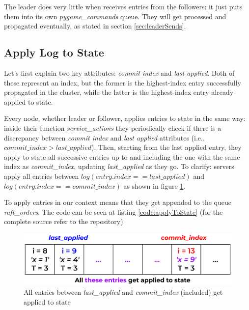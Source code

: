The leader does very little when receives entries from the followers: it just puts them into its own \textit{pygame\_commands} queue. They will get processed and propagated eventually, as stated in section \ref{sec:leaderSends}.

\subsection{Apply Log to State} \label{sec:applyToState}

Let's first explain two key attributes: \textit{commit index} and \textit{last applied}. Both of these represent an index, but the former is the highest-index entry successfully propagated in the cluster, while the latter is the highest-index entry already applied to state. 

Every node, whether leader or follower, applies entries to state in the same way: inside their function \textit{service\_actions} they periodically check if there is a discrepancy between \textit{commit index} and \textit{last applied} attributes (i.e., $commit\_index > last\_applied$). Then, starting from the last applied entry, they apply to state all successive entries up to and including the one with the same index as \textit{commit\_index}, updating \textit{last\_applied} as they go. To clarify: servers apply all entries between $log(entry.index == last\_applied)$ and $log(entry.index == commit\_index)$ as shown in figure \ref{fig:applyToState}. 

To apply entries in our context means that they get appended to the queue \textit{raft\_orders}. The code can be seen at listing \ref{code:applyToState} (for the complete source refer to the repository)

\begin{figure}[h]
  \centering
  \includegraphics[width=.8\linewidth]{images/applyToState.png}
  \caption{All entries between \textit{last\_applied} and \textit{commit\_index} (included) get applied to state}
  \label{fig:applyToState}
\end{figure}

